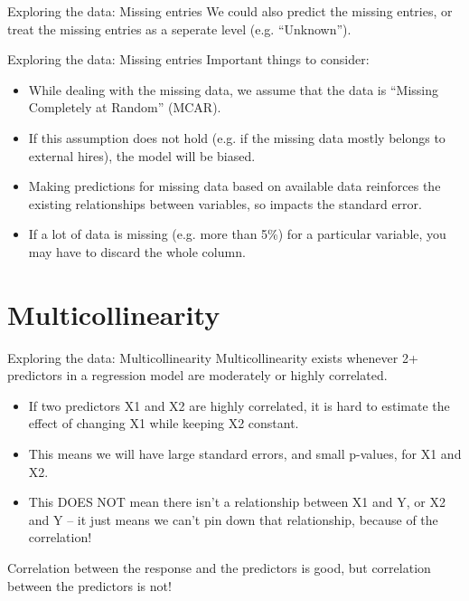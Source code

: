 \documentclass{beamer}\usepackage[]{graphicx}\usepackage[]{color}
\begin{document}
\begin{darkframes}
\begin{frame}[fragile]{Exploring the data: Missing entries}
      We could also predict the missing entries, or treat the missing entries as a seperate level (e.g. ``Unknown'').
\end{frame}
  
  
  
\begin{frame}[fragile]{Exploring the data: Missing entries}
      \alert{Important things to consider:}
      \begin{itemize}[<+->]
        \item While dealing with the missing data, we assume that the data is ``Missing Completely at Random'' (MCAR).
        \item If this assumption does not hold (e.g. if the missing data mostly belongs to external hires), the model will  be biased.        
        \item Making predictions for missing data based on available data reinforces the existing relationships between variables, so impacts the standard error.
        \item If a lot of data is missing (e.g. more than 5\%) for a particular variable, you may have to discard the whole column. 
      \end{itemize}
\end{frame}
    
    \section{Multicollinearity}
    
    
\begin{frame}[fragile]{Exploring the data: Multicollinearity}
      Multicollinearity exists whenever 2+ predictors in a regression model are moderately or highly correlated. \pause
      \begin{itemize}[<+->]
        \item If two predictors X1 and X2 are highly correlated, it is hard to estimate the effect of changing X1 while keeping X2 constant.
        \item This means we will have large standard errors, and small p-values, for X1 and X2.
        \item This DOES NOT mean there isn't a relationship between X1 and Y, or X2 and Y -- it just means we can't pin down that relationship, because of the correlation!
      \end{itemize}
      \pause
      Correlation between the response and the predictors is good, but correlation between the predictors is not!
\end{frame}
    

\end{darkframes}
\end{document}
